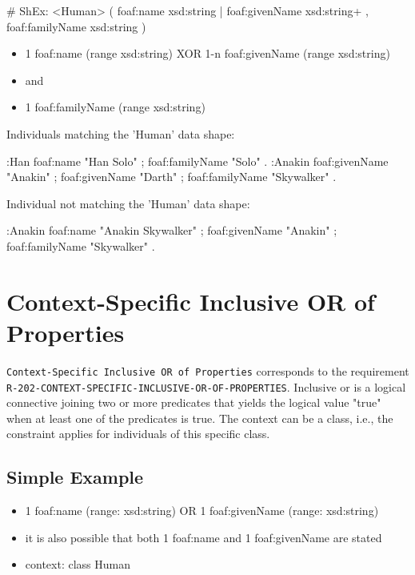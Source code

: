\documentclass{llncs}
\newcommand{\ms}[1]{\texttt{#1}}
\begin{document}
\begin{ex}
# ShEx:
<Human> { (  
    foaf:name xsd:string | foaf:givenName xsd:string+ , 
    foaf:familyName xsd:string ) }
\end{ex}

\begin{itemize}
	\item 1 foaf:name (range xsd:string) XOR 1-n foaf:givenName (range xsd:string)
	\item and
	\item 1 foaf:familyName (range xsd:string)
\end{itemize}

Individuals matching the 'Human' data shape:

\begin{ex}
:Han
    foaf:name "Han Solo" ;
    foaf:familyName "Solo" .
:Anakin
    foaf:givenName "Anakin" ;
    foaf:givenName "Darth" ;
    foaf:familyName "Skywalker" .
\end{ex}

Individual not matching the 'Human' data shape:

\begin{ex}
:Anakin
    foaf:name "Anakin Skywalker" ;
    foaf:givenName "Anakin" ;
    foaf:familyName "Skywalker" .
\end{ex}

\section{Context-Specific Inclusive OR of Properties}

\ms{Context-Specific Inclusive OR of Properties} corresponds to the requirement
\ms{R-202-CONTEXT-SPECIFIC-INCLUSIVE-OR-OF-PROPERTIES}.
Inclusive or is a logical connective joining two or more predicates that yields the logical value "true" when at least one of the predicates is true.
The context can be a class, i.e., the constraint applies for individuals of this specific class.

\subsection{Simple Example}

\begin{itemize}
	\item 1 foaf:name (range: xsd:string) OR 1 foaf:givenName (range: xsd:string)
	\item it is also possible that both 1 foaf:name and 1 foaf:givenName are stated
	\item context: class Human
\end{itemize}
\end{document}
